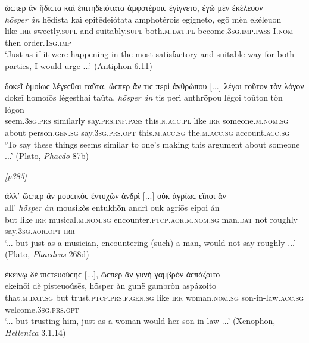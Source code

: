 \begin{exe}
\ex ὥϲπερ ἂν ἥδιϲτα καὶ ἐπιτηδειότατα ἀμφοτέροιϲ ἐγίγνετο, ἐγὼ μὲν ἐκέλευον\\
\gll \emph{hṓsper} \emph{àn} hḗdista kaì epitēdeiótata amphotérois egígneto, egṑ mèn ekéleuon\\
like \textsc{irr} sweetly.\textsc{supl} and suitably.\textsc{supl} both.\textsc{m.dat.pl} become.\textsc{3sg.imp.pass} I.\textsc{nom} then order.\textsc{1sg.imp}\\
\trans `Just as if it were happening in the most satisfactory and suitable way for both parties, I would urge ...' (Antiphon 6.11)
\label{osperan3}
\end{exe}

\begin{exe}
\ex δοκεῖ ὁμοίωϲ λέγεϲθαι ταῦτα, ὥϲπερ ἄν τιϲ περὶ ἀνθρώπου {[}...{]} λέγοι τοῦτον τὸν λόγον\\
\gll dokeî homoíōs légesthai taûta, \emph{hṓsper} \emph{án} tis perì anthrṓpou légoi toûton tòn lógon\\
seem.\textsc{3sg.prs} similarly say.\textsc{prs.inf.pass} this.\textsc{n.acc.pl} like \textsc{irr} someone.\textsc{m.nom.sg} about person.\textsc{gen.sg} say.\textsc{3sg.prs.opt} this.\textsc{m.acc.sg} the.\textsc{m.acc.sg} account.\textsc{acc.sg}\\
\trans `To say these things seems similar to one's making this argument about someone ...' (Plato, \textit{Phaedo} 87b)
\label{osperan4}
\end{exe}

\hyperlink{p385}{\emph{[p385]}}

\begin{exe}
\ex ἀλλ᾽ ὥϲπερ ἂν μουϲικὸϲ ἐντυχὼν ἀνδρὶ {[}...{]} οὐκ ἀγρίωϲ εἴποι ἄν\\
\gll all' \emph{hṓsper} \emph{àn} mousikòs entukhṑn andrì ouk agríōs eípoi án\\
but like \textsc{irr} musical.\textsc{m.nom.sg} encounter.\textsc{ptcp.aor.m.nom.sg} man.\textsc{dat} not roughly say.\textsc{3sg.aor.opt} \textsc{irr}\\
\trans `... but just as a musician, encountering (such) a man, would not say roughly ...' (Plato, \textit{Phaedrus} 268d)
\label{osperan5}
\end{exe}

\begin{exe}
\ex ἐκείνῳ δὲ πιϲτευούϲηϲ {[}...{]}, ὥϲπερ ἂν γυνὴ γαμβρὸν ἀϲπάζοιτο\\
\gll ekeínōi dè pisteuoúsēs, hṓsper àn gunḕ gambròn aspázoito\\
that.\textsc{m.dat.sg} but trust.\textsc{ptcp.prs.f.gen.sg} like \textsc{irr} woman.\textsc{nom.sg} son-in-law.\textsc{acc.sg} welcome.\textsc{3sg.prs.opt}\\
\trans `... but trusting him, just as a woman would her son-in-law ...' (Xenophon, \textit{Hellenica} 3.1.14)
\label{osperan6}
\end{exe}

